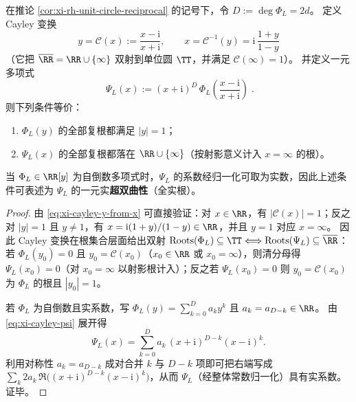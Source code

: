\begin{proposition}\label{prop:xi-rh-cayley-hyperbolicity}
在推论 \ref{cor:xi-rh-unit-circle-reciprocal} 的记号下，令 \(D:=\deg\Phi_L=2d\)。
定义 Cayley 变换
\begin{equation}\label{eq:xi-cayley-y-from-x}
\boxed{\;
y=\mathcal{C}(x):=\frac{x-\mathrm{i}}{x+\mathrm{i}},
\qquad
x=\mathcal{C}^{-1}(y)=\mathrm{i}\,\frac{1+y}{1-y}\;}
\end{equation}
（它把 \(\overline{\RR}=\RR\cup\{\infty\}\) 双射到单位圆 \(\TT\)，并满足 \(\mathcal{C}(\infty)=1\)）。
并定义一元多项式
\begin{equation}\label{eq:xi-cayley-psi}
\boxed{\;
\Psi_L(x):=(x+\mathrm{i})^{D}\,\Phi_L\!\left(\frac{x-\mathrm{i}}{x+\mathrm{i}}\right)\; }.
\end{equation}
则下列条件等价：
\begin{enumerate}
  \item \(\Phi_L(y)\) 的全部复根都满足 \(|y|=1\)；
  \item \(\Psi_L(x)\) 的全部复根都落在 \(\RR\cup\{\infty\}\)（按射影意义计入 \(x=\infty\) 的根）。
\end{enumerate}
当 \(\Phi_L\in\RR[y]\) 为自倒数多项式时，\(\Psi_L\) 的系数经归一化可取为实数，因此上述条件可表述为 \(\Psi_L\) 的一元实\textbf{超双曲性}（全实根）。
\end{proposition}
\begin{proof}
由 \eqref{eq:xi-cayley-y-from-x} 可直接验证：对 \(x\in\RR\)，有 \(|\mathcal{C}(x)|=1\)；反之对 \(|y|=1\) 且 \(y\neq 1\)，有 \(x=\mathrm{i}(1+y)/(1-y)\in\RR\)，并且 \(y=1\) 对应 \(x=\infty\)。
因此 Cayley 变换在根集合层面给出双射
\(
\mathrm{Roots}(\Phi_L)\subseteq\TT
\Longleftrightarrow
\mathrm{Roots}(\Psi_L)\subseteq\overline{\RR}
\)：
若 \(\Phi_L(y_0)=0\) 且 \(y_0=\mathcal{C}(x_0)\)（\(x_0\in\RR\) 或 \(x_0=\infty\)），则清分母得 \(\Psi_L(x_0)=0\)（对 \(x_0=\infty\) 以射影根计入）；反之若 \(\Psi_L(x_0)=0\) 则 \(y_0=\mathcal{C}(x_0)\) 为 \(\Phi_L\) 的根且 \(|y_0|=1\)。
\par
若 \(\Phi_L\) 为自倒数且实系数，写 \(\Phi_L(y)=\sum_{k=0}^{D}a_k y^k\) 且 \(a_k=a_{D-k}\in\RR\)。
由 \eqref{eq:xi-cayley-psi} 展开得
\[
\Psi_L(x)=\sum_{k=0}^{D} a_k\,(x+\mathrm{i})^{D-k}(x-\mathrm{i})^{k}.
\]
利用对称性 \(a_k=a_{D-k}\) 成对合并 \(k\) 与 \(D-k\) 项即可把右端写成 \(\sum_k 2a_k\,\Re\bigl((x+\mathrm{i})^{D-k}(x-\mathrm{i})^{k}\bigr)\)，从而 \(\Psi_L\)（经整体常数归一化）具有实系数。证毕。
\end{proof}

